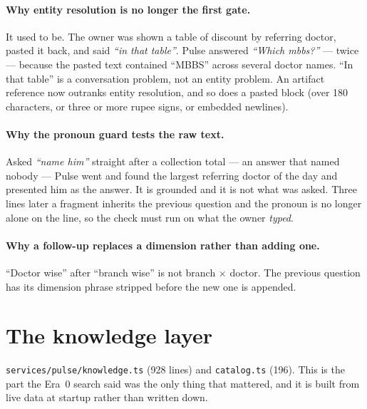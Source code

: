 \documentclass[11pt,a4paper]{report}
\newcommand{\file}[1]{\texttt{\small #1}}
\begin{document}
\paragraph{Why entity resolution is no longer the first gate.} It used to be. The owner was shown a
table of discount by referring doctor, pasted it back, and said \emph{``in that table''}. Pulse
answered \emph{``Which mbbs?''} --- twice --- because the pasted text contained ``MBBS'' across
several doctor names. ``In that table'' is a conversation problem, not an entity problem. An
artifact reference now outranks entity resolution, and so does a pasted block (over 180 characters,
or three or more rupee signs, or embedded newlines).

\paragraph{Why the pronoun guard tests the raw text.} Asked \emph{``name him''} straight after a
collection total --- an answer that named nobody --- Pulse went and found the largest referring
doctor of the day and presented him as the answer. It is grounded and it is not what was asked.
Three lines later a fragment inherits the previous question and the pronoun is no longer alone on
the line, so the check must run on what the owner \emph{typed}.

\paragraph{Why a follow-up replaces a dimension rather than adding one.} ``Doctor wise'' after
``branch wise'' is not branch $\times$ doctor. The previous question has its dimension phrase
stripped before the new one is appended.

\section{The knowledge layer}

\file{services/pulse/knowledge.ts} (928 lines) and \file{catalog.ts} (196). This is the part the
Era~0 search said was the only thing that mattered, and it is built from live data at startup
rather than written down.
\end{document}
